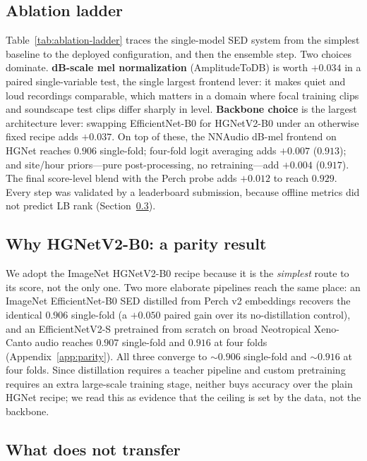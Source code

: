 \subsection{Ablation ladder}



Table~\ref{tab:ablation-ladder} traces the single-model SED system from the simplest baseline to
the deployed configuration, and then the ensemble step.
Two choices dominate.
\textbf{dB-scale mel normalization} (AmplitudeToDB) is worth $+0.034$ in a paired single-variable
test, the single largest frontend lever: it makes quiet and loud recordings comparable, which
matters in a domain where focal training clips and soundscape test clips differ sharply in level.
\textbf{Backbone choice} is the largest architecture lever: swapping EfficientNet-B0 for
HGNetV2-B0 under an otherwise fixed recipe adds $+0.037$.
On top of these, the NNAudio dB-mel frontend on HGNet reaches $0.906$ single-fold; four-fold
logit averaging adds $+0.007$ ($0.913$); and site/hour priors---pure post-processing, no
retraining---add $+0.004$ ($0.917$).
The final score-level blend with the Perch probe adds $+0.012$ to reach $0.929$.
Every step was validated by a leaderboard submission, because offline metrics did not predict LB
rank (Section~\ref{sec:negatives}).

\subsection{Why HGNetV2-B0: a parity result}

We adopt the ImageNet HGNetV2-B0 recipe because it is the \emph{simplest} route to its score, not
the only one.
Two more elaborate pipelines reach the same place: an ImageNet EfficientNet-B0 SED distilled from
Perch v2 embeddings recovers the identical $0.906$ single-fold (a $+0.050$ paired gain over its
no-distillation control), and an EfficientNetV2-S pretrained from scratch on broad Neotropical
Xeno-Canto audio reaches $0.907$ single-fold and $0.916$ at four folds (Appendix~\ref{app:parity}).
All three converge to ${\sim}0.906$ single-fold and ${\sim}0.916$ at four folds.
Since distillation requires a teacher pipeline and custom pretraining requires an extra
large-scale training stage, neither buys accuracy over the plain HGNet recipe; we read this as
evidence that the ceiling is set by the data, not the backbone.

\subsection{What does not transfer}
\label{sec:negatives}

